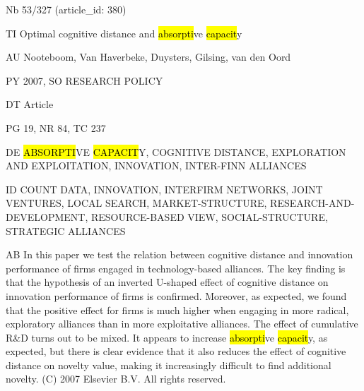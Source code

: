 \documentclass[a4paper]{article}
\begin{document}
\vspace*{-2cm}
Nb \tabto{0cm}53/327 (article\_id: 380)\par
TI \tabto{0cm}Optimal cognitive distance and \hl{absorpti}ve \hl{capacit}y\par
AU \tabto{0cm}Nooteboom, Van Haverbeke, Duysters, Gilsing, van den Oord\par
PY \tabto{0cm}2007, SO RESEARCH POLICY\par
DT \tabto{0cm}Article\par
PG \tabto{0cm}19, NR 84, TC 237\par
DE \tabto{0cm}\hl{ABSORPTI}VE \hl{CAPACIT}Y, COGNITIVE DISTANCE, EXPLORATION AND EXPLOITATION, INNOVATION, INTER-FINN ALLIANCES\par
ID \tabto{0cm}COUNT DATA, INNOVATION, INTERFIRM NETWORKS, JOINT VENTURES, LOCAL SEARCH, MARKET-STRUCTURE, RESEARCH-AND-DEVELOPMENT, RESOURCE-BASED VIEW, SOCIAL-STRUCTURE, STRATEGIC ALLIANCES\par
AB \tabto{0cm}In this paper we test the relation between cognitive distance and innovation performance of firms engaged in technology-based alliances. The key finding is that the hypothesis of an inverted U-shaped effect of cognitive distance on innovation performance of firms is confirmed. Moreover, as expected, we found that the positive effect for firms is much higher when engaging in more radical, exploratory alliances than in more exploitative alliances. The effect of cumulative R\&D turns out to be mixed. It appears to increase \hl{absorpti}ve \hl{capacit}y, as expected, but there is clear evidence that it also reduces the effect of cognitive distance on novelty value, making it increasingly difficult to find additional novelty. (C) 2007 Elsevier B.V. All rights reserved.\par
\clearpage
\end{document}
